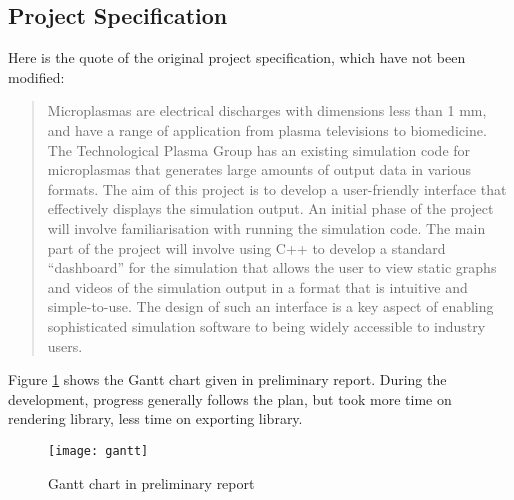 \clearpage
\begin{appendices}

\section{Project Specification}

Here is the quote of the original project specification, which have not been modified:

\begin{quote}
	Microplasmas are electrical discharges with dimensions less than 1 mm, and have a range of application from plasma televisions to biomedicine. The Technological Plasma Group has an existing simulation code for microplasmas that generates large amounts of output data in various formats. The aim of this project is to develop a user-friendly interface that effectively displays the simulation output. An initial phase of the project will involve familiarisation with running the simulation code. The main part of the project will involve using C++ to develop a standard ``dashboard'' for the simulation that allows the user to view static graphs and videos of the simulation output in a format that is intuitive and simple-to-use. The design of such an interface is a key aspect of enabling sophisticated simulation software to being widely accessible to industry users.
\end{quote}

Figure \ref{fig:gantt} shows the Gantt chart given in preliminary report. During the development, progress generally follows the plan, but took more time on rendering library, less time on exporting library.

\begin{figure}[!htb]
	\centering
	\texttt{[image: gantt]}
	\caption{Gantt chart in preliminary report}
	\label{fig:gantt}
\end{figure}

\end{appendices}


